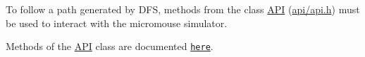 To follow a path generated by D\+FS, methods from the class \hyperlink{class_a_p_i}{A\+PI} (\hyperlink{api_8h}{api/api.\+h}) must be used to interact with the micromouse simulator.
\begin{DoxyItemize}
\item Methods of the \hyperlink{class_a_p_i}{A\+PI} class are documented \href{https://github.com/mackorone/mms#summary}{\tt here}. 
\end{DoxyItemize}
